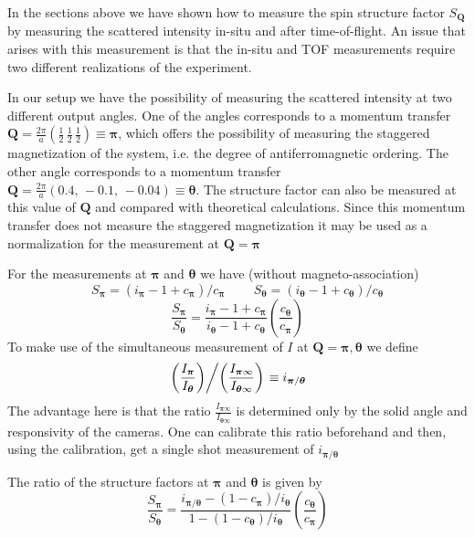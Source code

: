 \documentclass[11pt,letter]{article}
\newcommand{\bv}[1]{\ensuremath{\bm{#1}}}
\newcommand{\Itof}[1]{\ensuremath{I_{\bv{#1}\infty} }}
\newcommand{\ipith}{\ensuremath{i_{\bv{\pi}/\bv{\theta}}}}
\begin{document}
In the sections above we have shown how to measure the spin structure factor
$S_{\bv{Q}}$  by measuring the scattered intensity in-situ and after
time-of-flight.  An issue that arises with this measurement is that the in-situ
and TOF measurements require two different realizations of the experiment.  

In our setup we have the possibility of measuring the scattered intensity at
two different output angles.  One of the angles corresponds to a momentum
transfer $\bv{Q} = \frac{2\pi}{a} ( \frac{1}{2}\, \frac{1}{2}\, \frac{1}{2} )
\equiv \bv{\pi}$,  which offers the possibility of measuring the staggered
magnetization of the system, i.e. the degree of antiferromagnetic ordering.
The other angle corresponds to a momentum transfer $\bv{Q} = \frac{2\pi}{a}(
0.4,\, -0.1,\, -0.04 ) \equiv \bv{\theta}$.  The structure factor can also be
measured at this value of $\bv{Q}$ and compared with theoretical calculations.
Since this momentum transfer does not measure the staggered magnetization 
it may be used as a normalization for the measurement at $\bv{Q}=\bv{\pi}$

For the measurements at $\bv{\pi}$ and $\bv{\theta}$ we have (without
magneto-association)
\begin{equation}
   S_{\bv{\pi}} = (i_{\bv{\pi}} - 1 + c_{\bv{\pi}})/c_{\bv{\pi}}
  \ \ \ \ \ \ \ \ \ \ 
   S_{\bv{\theta}} = (i_{\bv{\theta}} - 1 + c_{\bv{\theta}})/c_{\bv{\theta}}
\end{equation}
\begin{equation}
  \frac{ S_{\bv{\pi}} }{ S_{\bv{\theta}}} = 
  \frac{ i_{\bv{\pi}} - 1 + c_{\bv{\pi}} }{ i_{\bv{\theta}} - 1 + c_{\bv{\theta}} } 
  \left( \frac{ c_{\bv{\theta}} }{ c_{\bv{\pi}}} \right)
\end{equation}
To make use of the simultaneous measurement of $I$ at $\bv{Q}= \bv{\pi},
\bv{\theta}$ we define 
\begin{equation}
  \left. 
  \left( \frac{ I_{\bv{\pi}} }{ I_{\bv{\theta}}} \right)  \middle/  
  \left( \frac{ \Itof{\pi} }{ \Itof{\theta} } \right)  
  \right.  \equiv \ipith
\end{equation}
The advantage here is that the ratio $\frac{ \Itof{\pi} }{ \Itof{\theta} }$ is
determined only by the solid angle and responsivity of the cameras.  One can
calibrate this ratio beforehand and then, using the calibration, get a single
shot measurement of $\ipith$

The ratio of the structure factors at $\bv{\pi}$ and $\bv{\theta}$ is given by
\begin{equation}
  \frac{ S_{\bv{\pi}} }{ S_{\bv{\theta}} } = 
  \frac{ \ipith  - ( 1 - c_{\bv{\pi}} )/i_{\bv{\theta}} }
        { 1 - (1 - c_{\bv{\theta}})/i_{\bv{\theta}} } 
  \left( \frac{ c_{\bv{\theta}} }{ c_{\bv{\pi}}} \right)
\end{equation}
\end{document}

